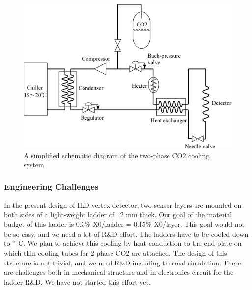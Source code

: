 \begin{figure}
    \includegraphics[width=\textwidth]{VertexDetector/FPCCD/coolingSystemSchematic.png}
    \caption{A simplified schematic diagram of the two-phase CO2 cooling system}
    \label{fig:FPCCD:coolingSystemSchematic}
\end{figure}

\subsubsection{Engineering Challenges}
    In the present design of ILD vertex detector, two sensor layers are mounted on both sides of a light-weight ladder of ~2 mm thick. Our goal of the material budget of this ladder is 0.3\% X0/ladder = 0.15\% X0/layer. This goal would not be so easy, and we need a lot of R\&D effort.
    The ladders have to be cooled down to \unit[-40]{\degree C}. We plan to achieve this cooling by heat conduction to the end-plate on which thin cooling tubes for 2-phase CO2 are attached. The design of this structure is not trivial, and we need R\&D including thermal simulation.
    There are challenges both in mechanical structure and in electronics circuit for the ladder R\&D. We have not started this effort yet.
